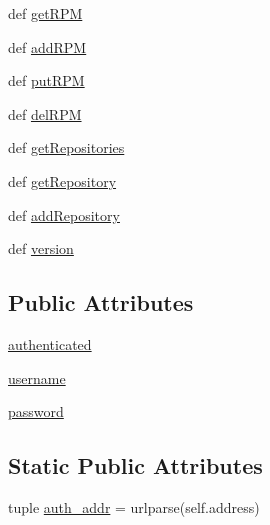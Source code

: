 \begin{DoxyCompactItemize}
\item 
def \hyperlink{classpysusestudio_1_1pysusestudio_1_1py_suse_studio_ae3e37842905fcb2123c399ca174ac131}{getRPM}
\item 
def \hyperlink{classpysusestudio_1_1pysusestudio_1_1py_suse_studio_a6b47e03a278d2d51e82eeecb6420f2e1}{addRPM}
\item 
def \hyperlink{classpysusestudio_1_1pysusestudio_1_1py_suse_studio_a0e6e12957104f14936bcce1c48756c4b}{putRPM}
\item 
def \hyperlink{classpysusestudio_1_1pysusestudio_1_1py_suse_studio_aca0d4536785c58675461f742aeb307bd}{delRPM}
\item 
def \hyperlink{classpysusestudio_1_1pysusestudio_1_1py_suse_studio_a01ef6840873e9224e3afa658d1454108}{getRepositories}
\item 
def \hyperlink{classpysusestudio_1_1pysusestudio_1_1py_suse_studio_ad68a641c2543f9da9937bea46d9a60f1}{getRepository}
\item 
def \hyperlink{classpysusestudio_1_1pysusestudio_1_1py_suse_studio_a0ac81e92b04d4d62acb3d9f3b2bb263a}{addRepository}
\item 
def \hyperlink{classpysusestudio_1_1pysusestudio_1_1py_suse_studio_adf9b20edaae96febee362f9c33c4c675}{version}
\end{DoxyCompactItemize}
\subsection*{Public Attributes}
\begin{DoxyCompactItemize}
\item 
\hyperlink{classpysusestudio_1_1pysusestudio_1_1py_suse_studio_abb743b21d3ca5e73f14f47319b5a21d7}{authenticated}
\item 
\hyperlink{classpysusestudio_1_1pysusestudio_1_1py_suse_studio_a3e5137f4bd1b1c549ac212b8a004cee9}{username}
\item 
\hyperlink{classpysusestudio_1_1pysusestudio_1_1py_suse_studio_a1f942bd3e98e4d947e83ad69c84b1dea}{password}
\end{DoxyCompactItemize}
\subsection*{Static Public Attributes}
\begin{DoxyCompactItemize}
\item 
tuple \hyperlink{classpysusestudio_1_1pysusestudio_1_1py_suse_studio_a5c38f6b993045f4153e3582569334e40}{auth\_\-addr} = urlparse(self.address)
\end{DoxyCompactItemize}



